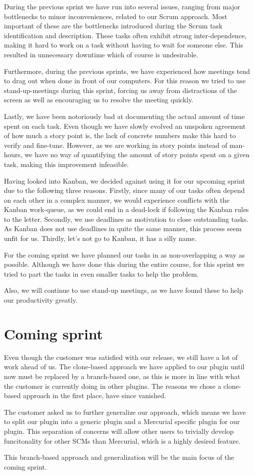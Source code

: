 \documentclass[a4paper,11pt]{article}
\begin{document}
During the previous sprint we have run into several issues, ranging from major
bottlenecks to minor inconveniences, related to our Scrum approach. Most important
of these are the bottlenecks introduced during the Scrum task identification and
description. These tasks often exhibit strong inter-dependence, making it hard to
work on a task without having to wait for someone else. This resulted in unnecessary
downtime which of course is undesirable. 

Furthermore, during the previous sprints, we have experienced how meetings tend
to drag out when done in front of our computers. For this reason we tried to
use stand-up-meetings during this sprint, forcing us away from distractions of
the screen as well as encouraging us to resolve the meeting quickly.

Lastly, we have been notoriously bad at documenting the actual amount of time
spent on each task. Even though we have slowly evolved an unspoken agreement of
how much a story point is, the lack of concrete numbers make this hard to
verify and fine-tune. However, as we are working in story points instead of 
man-hours, we have no way of quantifying the amount of story points spent on a
given task, making this improvement infeasible. 

Having looked into Kanban, we decided against using it for our upcoming sprint
due to the following three reasons. Firstly, since many of our tasks often depend
on each other in a complex manner, we would experience conflicts with the Kanban
work-queue, as we could end in a dead-lock if following the Kanban rules to the
letter. Secondly, we use deadlines as motivation to close outstanding tasks. As
Kanban does not use deadlines in quite the same manner, this process seem unfit
for us. Thirdly, let's not go to Kanban, it has a silly name.

For the coming sprint we have planned our tasks in as non-overlapping a way as
possible. Although we have done this during the entire course, for this sprint
we tried to part the tasks in even smaller tasks to help the problem.

Also, we will continue to use stand-up meetings, as we have found these to help
our productivity greatly.

\section{Coming sprint}
Even though the customer was satisfied with our release, we still have a lot of
work ahead of us. The clone-based approach we have applied to our plugin until
now must be replaced by a branch-based one, as this is more in line with what the
customer is currently doing in other plugins. The reasons we chose a clone-based
approach in the first place, have since vanished.

The customer asked us to further generalize our approach, which means we have to
split our plugin into a generic plugin and a Mercurial specific plugin for our
plugin. This separation of concerns will allow other users to trivially develop
funcitonality for other SCMs than Mercurial, which is a highly desired feature.

This branch-based approach and generalization will be the main focus of the coming
sprint.
\end{document}
